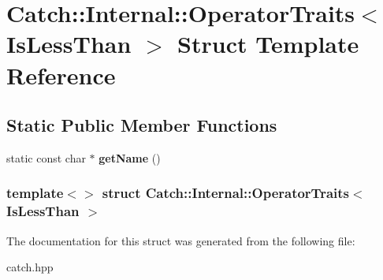 \hypertarget{structCatch_1_1Internal_1_1OperatorTraits_3_01IsLessThan_01_4}{
\section{Catch::Internal::OperatorTraits$<$ IsLessThan $>$ Struct Template Reference}
\label{structCatch_1_1Internal_1_1OperatorTraits_3_01IsLessThan_01_4}
}
\subsection*{Static Public Member Functions}
\begin{DoxyCompactItemize}
\item 
\hypertarget{structCatch_1_1Internal_1_1OperatorTraits_3_01IsLessThan_01_4_aa3b536ddbd2e34b1253931ff00c32712}{
static const char $\ast$ {\bfseries getName} ()}
\label{structCatch_1_1Internal_1_1OperatorTraits_3_01IsLessThan_01_4_aa3b536ddbd2e34b1253931ff00c32712}

\end{DoxyCompactItemize}
\subsubsection*{template$<$$>$ struct Catch::Internal::OperatorTraits$<$ IsLessThan $>$}



The documentation for this struct was generated from the following file:\begin{DoxyCompactItemize}
\item 
catch.hpp\end{DoxyCompactItemize}
